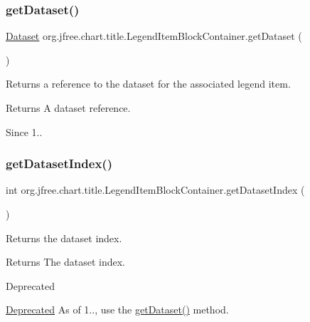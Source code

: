 \subsubsection{\texorpdfstring{get\+Dataset()}{getDataset()}}
{\footnotesize\ttfamily \mbox{\hyperlink{interfaceorg_1_1jfree_1_1data_1_1general_1_1_dataset}{Dataset}} org.\+jfree.\+chart.\+title.\+Legend\+Item\+Block\+Container.\+get\+Dataset (\begin{DoxyParamCaption}{ }\end{DoxyParamCaption})}

Returns a reference to the dataset for the associated legend item.

\begin{DoxyReturn}{Returns}
A dataset reference.
\end{DoxyReturn}
\begin{DoxySince}{Since}
1.. 
\end{DoxySince}
\mbox{\label{classorg_1_1jfree_1_1chart_1_1title_1_1_legend_item_block_container_a14f56b18ce62c0b8edba0011498e1008}} 
\subsubsection{\texorpdfstring{get\+Dataset\+Index()}{getDatasetIndex()}}
{\footnotesize\ttfamily int org.\+jfree.\+chart.\+title.\+Legend\+Item\+Block\+Container.\+get\+Dataset\+Index (\begin{DoxyParamCaption}{ }\end{DoxyParamCaption})}

Returns the dataset index.

\begin{DoxyReturn}{Returns}
The dataset index.
\end{DoxyReturn}
\begin{DoxyRefDesc}{Deprecated}
\item[\mbox{\hyperlink{deprecated__deprecated000251}{Deprecated}}]As of 1.., use the \mbox{\hyperlink{classorg_1_1jfree_1_1chart_1_1title_1_1_legend_item_block_container_a0e7e9572a3f3e8f77b1c44ab1befc851}{get\+Dataset()}} method. \end{DoxyRefDesc}
\mbox{\label{classorg_1_1jfree_1_1chart_1_1title_1_1_legend_item_block_container_a6fc7067d932bd437d673f5a9216291af}} 
